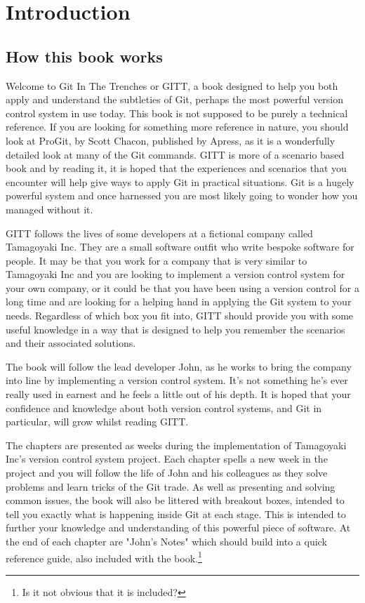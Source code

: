 \cleardoublepage
\chapter{Introduction}
\section{How this book works}

Welcome to Git In The Trenches or GITT, a book designed to help you both apply and understand the subtleties of Git, perhaps the most powerful version control system in use today.
This book is not supposed to be purely a technical reference.
If you are looking for something more reference in nature, you should look at ProGit, by Scott Chacon, published by Apress, as it is a wonderfully detailed look at many of the Git commands.
GITT is more of a scenario based book and by reading it, it is hoped that the experiences and scenarios that you encounter will help give ways to apply Git in practical situations.
Git is a hugely powerful system and once harnessed you are most likely going to wonder how you managed without it.

GITT follows the lives of some developers at a fictional company called Tamagoyaki Inc.
They are a small software outfit who write bespoke software for people.
It may be that you work for a company that is very similar to Tamagoyaki Inc and you are looking to implement a version control system for your own company, or it could be that you have been using a version control for a long time and are looking for a helping hand in applying the Git system to your needs.
Regardless of which box you fit into, GITT should provide you with some useful knowledge in a way that is designed to help you remember the scenarios and their associated solutions.

The book will follow the lead developer John, as he works to bring the company into line by implementing a version control system.
It's not something he's ever really used in earnest and he feels a little out of his depth.
It is hoped that your confidence and knowledge about both version control systems, and Git in particular, will grow whilst reading GITT.

The chapters are presented as weeks during the implementation of Tamagoyaki Inc's version control system project.
Each chapter spells a new week in the project and you will follow the life of John and his colleagues as they solve problems and learn tricks of the Git trade.
As well as presenting and solving common issues, the book will also be littered with breakout boxes, intended to tell you exactly what is happening inside Git at each stage.
This is intended to further your knowledge and understanding of this powerful piece of software.
At the end of each chapter are "John's Notes" which should build into a quick reference guide, also included with the book.\footnote{Is it not obvious that it is included?}

